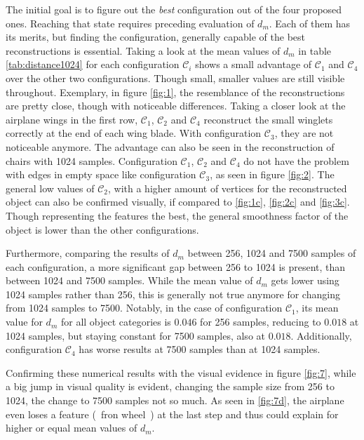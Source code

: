     The initial goal is to figure out the \emph{best} configuration out of the four proposed ones.
    Reaching that state requires preceding evaluation of $d_m$. Each of them has its merits, but finding the configuration,
    generally capable of the best reconstructions is essential. 
    Taking a look at the mean values of $d_m$ in table \ref{tab:distance1024} for each configuration $\mathcal{C}_i$  shows a small 
    advantage of $\mathcal{C}_1$ and $\mathcal{C}_4$ over the other two configurations. 
    Though small, smaller values are still visible throughout. 
    Exemplary, in figure \ref{fig:1}, the resemblance of the reconstructions are pretty close, though with noticeable differences.
    Taking a closer look at the airplane wings in the first row, $\mathcal{C}_1$, $\mathcal{C}_2$ and $\mathcal{C}_4$ reconstruct
    the small winglets correctly at the end of each wing blade. With configuration $\mathcal{C}_3$, they are not noticeable anymore.
    The advantage can also be seen in the reconstruction of chairs with 1024 samples.  Configuration $\mathcal{C}_1$, $\mathcal{C}_2$
    and $\mathcal{C}_4$ do not have the problem with edges in empty space like configuration $\mathcal{C}_3$, as seen in figure \ref{fig:2}.
    The general low values of $\mathcal{C}_2$, with a higher amount of vertices for the reconstructed object can also be confirmed visually,
    if compared to \ref{fig:1c}, \ref{fig:2c} and \ref{fig:3c}. Though representing the features the best, the general smoothness factor of the object is 
    lower than the other configurations.

    Furthermore, comparing the results of $d_m$ between 256, 1024 and 7500 samples of each configuration, a more significant gap 
    between 256 to 1024 is present, than between 1024 and 7500 samples.
    While the mean value of $d_m$ gets lower using 1024 samples rather than 256, this is generally not true anymore for changing 
    from 1024 samples to 7500.
    Notably, in the case of configuration $\mathcal{C}_1$, its mean value for $d_m$ for all object categories is $0.046$ for 256 samples,
    reducing to $0.018$ at 1024 samples, but staying constant for 7500 samples, also at $0.018$. Additionally, configuration $\mathcal{C}_4$
    has worse results at 7500 samples than at 1024 samples.

    Confirming these numerical results with the visual evidence in figure \ref{fig:7}, 
    while a big jump in visual quality is evident, changing the sample size from 256 to 1024, 
    the change to 7500 samples not so much. As seen in \ref{fig:7d}, the airplane even loses a 
    feature (~fron wheel~) at the last step and thus could explain for higher or equal mean values 
    of $d_m$.

